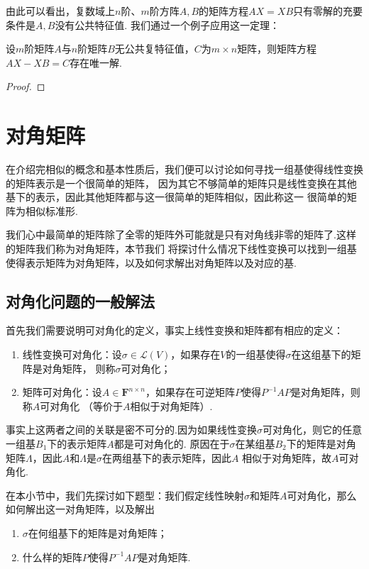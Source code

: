 由此可以看出，复数域上$n$阶、$m$阶方阵$A,B$的矩阵方程$AX=XB$只有零解的充要条件是$A,B$没有公共特征值.
我们通过一个例子应用这一定理：
\begin{example}
    设$m$阶矩阵$A$与$n$阶矩阵$B$无公共复特征值，$C$为$m\times n$矩阵，则矩阵方程$AX-XB=C$存在唯一解.
\end{example}
\begin{proof}
    
\end{proof}

\section{对角矩阵}
在介绍完相似的概念和基本性质后，我们便可以讨论如何寻找一组基使得线性变换的矩阵表示是一个很简单的矩阵，
因为其它不够简单的矩阵只是线性变换在其他基下的表示，因此其他矩阵都与这一很简单的矩阵相似，因此称这一
很简单的矩阵为相似标准形.

我们心中最简单的矩阵除了全零的矩阵外可能就是只有对角线非零的矩阵了.这样的矩阵我们称为对角矩阵，本节我们
将探讨什么情况下线性变换可以找到一组基使得表示矩阵为对角矩阵，以及如何求解出对角矩阵以及对应的基.

\subsection{对角化问题的一般解法}
首先我们需要说明可对角化的定义，事实上线性变换和矩阵都有相应的定义：
\begin{definition}
    \begin{enumerate}
        \item 线性变换可对角化：设$\sigma\in\mathcal{L}(V)$，如果存在$V$的一组基使得$\sigma$在这组基下的矩阵是对角矩阵，
        则称$\sigma$可对角化；
        \item 矩阵可对角化：设$A\in\mathbf{F}^{n\times n}$，如果存在可逆矩阵$P$使得$P^{-1}AP$是对角矩阵，则称$A$可对角化
        （等价于$A$相似于对角矩阵）.
    \end{enumerate}
\end{definition}

事实上这两者之间的关联是密不可分的.因为如果线性变换$\sigma$可对角化，则它的任意一组基$B_1$下的表示矩阵$A$都是可对角化的.
原因在于$\sigma$在某组基$B_2$下的矩阵是对角矩阵$\Lambda$，因此$A$和$\Lambda$是$\sigma$在两组基下的表示矩阵，因此$A$
相似于对角矩阵，故$A$可对角化.

在本小节中，我们先探讨如下题型：我们假定线性映射$\sigma$和矩阵$A$可对角化，那么如何解出这一对角矩阵，以及解出
\begin{enumerate}
    \item $\sigma$在何组基下的矩阵是对角矩阵；
    \item 什么样的矩阵$P$使得$P^{-1}AP$是对角矩阵.
\end{enumerate}

